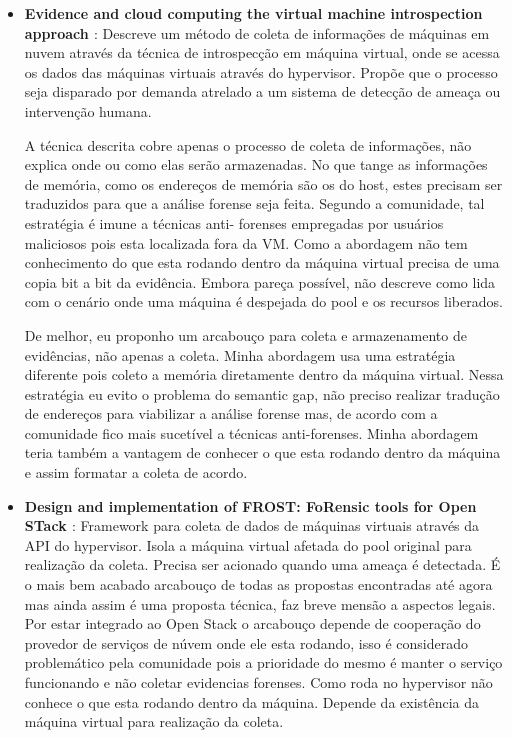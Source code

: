 \documentclass[
	12pt,				%
	openright,			%
	oneside,			%
	a4paper,			%
	english,			%
	french,				%
	spanish,			%
	brazil,				%
	]{abntex2}
\begin{document}
\begin{itemize}
\item \textbf{Evidence and cloud computing the virtual machine introspection approach \cite{Poisel2013} }: Descreve um método de coleta de informações de máquinas
em nuvem através da técnica de introspecção em máquina virtual, onde se acessa os dados das máquinas virtuais através do hypervisor. Propõe que o processo seja disparado
por demanda atrelado a um sistema de detecção de ameaça ou intervenção humana.

A técnica descrita cobre apenas o processo de coleta de informações, não explica onde ou como elas serão armazenadas. No que tange as informações de memória, como os 
endereços de memória são os do host, estes precisam ser traduzidos para que a análise forense seja feita. Segundo a comunidade, tal estratégia é imune a técnicas anti-
forenses empregadas por usuários maliciosos pois esta localizada fora da VM. Como a abordagem não tem conhecimento do que esta rodando dentro da máquina virtual precisa
de uma copia bit a bit da evidência. Embora pareça possível, não descreve como lida com o cenário onde uma máquina é despejada do pool e os recursos liberados. 

De melhor, eu proponho um arcabouço para coleta e armazenamento de evidências, não apenas a coleta. Minha abordagem usa uma estratégia diferente pois coleto a memória diretamente
dentro da máquina virtual. Nessa estratégia eu evito o problema do semantic gap, não preciso realizar tradução de endereços para viabilizar a análise forense mas, de acordo com 
a comunidade fico mais sucetível a técnicas anti-forenses. Minha abordagem teria também a vantagem de conhecer o que esta rodando dentro da máquina e assim formatar a coleta 
de acordo.\\

\item \textbf{Design and implementation of FROST: FoRensic tools for Open STack \cite{Dykstra2013} }: Framework para coleta de dados de máquinas virtuais através da API do
hypervisor. Isola a máquina virtual afetada do pool original para realização da coleta. Precisa ser acionado quando uma ameaça é detectada. É o mais bem acabado arcabouço de
todas as propostas encontradas até agora mas ainda assim é uma proposta técnica, faz breve mensão a aspectos legais. Por estar integrado ao Open Stack o arcabouço depende de
cooperação do provedor de serviços de núvem onde ele esta rodando, isso é considerado problemático pela comunidade pois a prioridade do mesmo é manter o serviço funcionando
e não coletar evidencias forenses. Como roda no hypervisor não conhece o que esta rodando dentro da máquina. Depende da existência da máquina virtual para realização da coleta.


\end{itemize}
\end{document}
